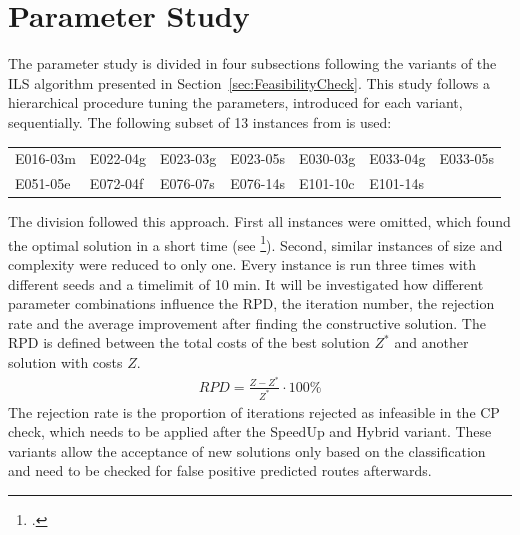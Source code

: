 \section{Parameter Study}
\label{sec:parameter_study}

The parameter study is divided in four subsections following the variants of the \gls{ILS} algorithm
presented in Section~\ref{sec:FeasibilityCheck}. This study follows a hierarchical procedure
tuning the parameters, introduced for each variant, sequentially. The following subset of 13
instances from \gendreauDataSetText is used:


\begin{table}[ht]
	\centering
	\setlength{\tabcolsep}{0.75em}
	\def\arraystretch{1.5}
	\begin{tabular}{lllllll}
		E016-03m & E022-04g & E023-03g & E023-05s & E030-03g & E033-04g & E033-05s \\
		E051-05e & E072-04f & E076-07s & E076-14s & E101-10c & E101-14s &          \\
	\end{tabular}
\end{table}

The division followed this approach. First all instances were omitted, which found
the optimal solution in a short time (see \cite{tamke_branch-and-cut_2024}\footcite[cf.][p. 26]{tamke_branch-and-cut_2024}).
Second, similar instances of size and complexity were reduced to only one.
Every instance is run three times with different seeds and a timelimit of 10 min. It will be investigated
how different parameter combinations influence the \gls{RPD}, the iteration number, the rejection rate and
the average improvement after finding the constructive solution. The \gls{RPD} is defined between the
total costs of the best solution $Z^*$ and another solution with costs $Z$.
\begin{align}
	RPD = \frac{Z - Z^*}{Z^*} \cdot 100\%
\end{align}
The rejection rate is the proportion of iterations rejected as infeasible in the \gls{CP} check, which needs
to be applied after the SpeedUp and Hybrid  variant. These variants allow the acceptance of
new solutions only based on the classification and need to be checked for false positive predicted routes afterwards.

